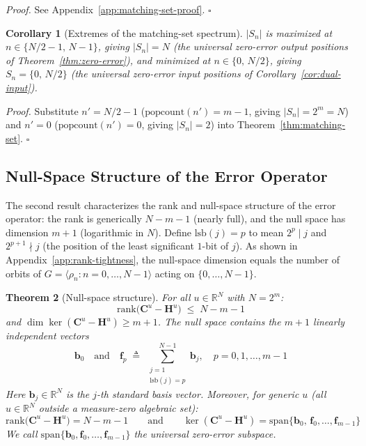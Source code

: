 \documentclass[11pt]{article}
\newtheorem{theorem}{Theorem}
\newtheorem{corollary}[theorem]{Corollary}
\begin{document}
\medskip
\noindent\textit{Proof.} See Appendix~\ref{app:matching-set-proof}. $\square$

\begin{corollary}[Extremes of the matching-set spectrum]\label{cor:extremes}
$|S_n|$ is maximized at $n \in \{N/2-1,\,N-1\}$, giving $|S_n| = N$ (the universal zero-error output positions of Theorem~\ref{thm:zero-error}), and minimized at $n \in \{0,\,N/2\}$, giving $S_n = \{0,\,N/2\}$ (the universal zero-error input positions of Corollary~\ref{cor:dual-input}).
\end{corollary}

\noindent\textit{Proof.} Substitute $n' = N/2-1$ ($\mathrm{popcount}(n') = m-1$, giving $|S_n| = 2^m = N$) and $n' = 0$ ($\mathrm{popcount}(n') = 0$, giving $|S_n| = 2$) into Theorem~\ref{thm:matching-set}. $\square$

\subsection{Null-Space Structure of the Error Operator}
\label{sec:null-space}

The second result characterizes the rank and null-space structure of the error operator: the rank is generically $N-m-1$ (nearly full), and the null space has dimension $m+1$ (logarithmic in $N$). Define $\mathrm{lsb}(j) = p$ to mean $2^p \mid j$ and $2^{p+1} \nmid j$ (the position of the least significant $1$-bit of $j$). As shown in Appendix~\ref{app:rank-tightness}, the null-space dimension equals the number of orbits of $G = \langle\rho_n : n=0,\ldots,N-1\rangle$ acting on $\{0,\ldots,N-1\}$.

\begin{theorem}[Null-space structure]\label{thm:null-space}
For all $u \in \mathbb{R}^N$ with $N = 2^m$:
\begin{equation}
    \mathrm{rank}\bigl(\mathbf{C}^u - \mathbf{H}^u\bigr) \;\leq\; N - m - 1
\end{equation}
and $\dim\ker(\mathbf{C}^u - \mathbf{H}^u) \geq m+1$. The null space contains the $m+1$ linearly independent vectors
\begin{equation}
    \mathbf{b}_0 \quad\text{and}\quad \mathbf{f}_p \;\triangleq\; \sum_{\substack{j=1 \\ \mathrm{lsb}(j)=p}}^{N-1} \mathbf{b}_j, \quad p = 0, 1, \ldots, m-1
\end{equation}
Here $\mathbf{b}_j \in \mathbb{R}^N$ is the $j$-th standard basis vector. Moreover, for generic $u$ (all $u \in \mathbb{R}^N$ outside a measure-zero algebraic set):
\begin{equation}
    \mathrm{rank}\bigl(\mathbf{C}^u - \mathbf{H}^u\bigr) = N - m - 1
    \qquad\text{and}\qquad
    \ker(\mathbf{C}^u - \mathbf{H}^u) = \mathrm{span}\{\mathbf{b}_0,\,\mathbf{f}_0,\ldots,\mathbf{f}_{m-1}\}
\end{equation}
We call $\mathrm{span}\{\mathbf{b}_0,\mathbf{f}_0,\ldots,\mathbf{f}_{m-1}\}$ the \emph{universal zero-error subspace}.
\end{theorem}
\end{document}
